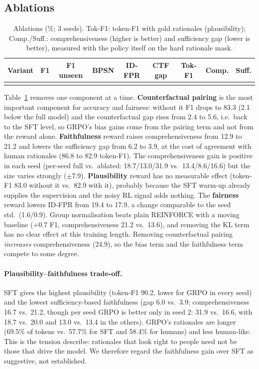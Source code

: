 \documentclass[11pt]{article}
\begin{document}
\subsection{Ablations}
\begin{table}[t]
\centering\small\setlength{\tabcolsep}{3.4pt}
\begin{tabular}{lcccccccc}
\toprule
Variant & F1 & F1 unseen & BPSN & ID-FPR & CTF gap & Tok-F1 & Comp. & Suff.\\
\midrule
\\
\bottomrule
\end{tabular}
\caption{Ablations (\%; 3 seeds). Tok-F1: token-F1 with gold rationales (plausibility); Comp./Suff.: comprehensiveness (higher is better) and
sufficiency gap (lower is better), measured with the policy itself on the hard rationale mask.}
\label{tab:abl}
\end{table}
Table~\ref{tab:abl} removes one component at a time. \textbf{Counterfactual pairing} is the most important component for accuracy and fairness: without it F1 drops to 83.3 (2.1 below
the full model) and the counterfactual gap rises from 2.4 to 5.6, i.e.\ back to the SFT level, so GRPO's bias gains come
from the pairing term and not from the reward alone. \textbf{Faithfulness} reward raises comprehensiveness from 12.9 to 21.2 and lowers the sufficiency gap
from 6.2 to 3.9, at the cost of agreement with human rationales (86.8 to 82.9 token-F1). The comprehensiveness gain is positive in each seed (per-seed full vs.\ ablated: 18.7/13.0/31.9 vs.\ 13.4/8.6/16.6)
but the size varies strongly ($\pm$7.9). \textbf{Plausibility} reward has no measurable effect (token-F1 83.0 without it vs.\ 82.9 with it), probably because the SFT warm-up already supplies the
supervision and the noisy RL signal adds nothing. The \textbf{fairness} reward lowers ID-FPR from 19.4 to 17.9, a change comparable to the seed std.\ (1.6/0.9). Group normalisation
beats plain REINFORCE with a moving baseline (+0.7 F1, comprehensiveness 21.2 vs.\ 13.6), and removing the KL term has no clear effect at this training length. Removing counterfactual pairing
\emph{increases} comprehensiveness (24.9), so the bias term and the faithfulness term compete to some degree.

\paragraph{Plausibility--faithfulness trade-off.} SFT gives the highest plausibility (token-F1 90.2, lower for GRPO in every seed) and the lowest sufficiency-based faithfulness (gap 6.0 vs.\ 3.9; comprehensiveness 16.7 vs.\ 21.2, though per seed GRPO is
better only in seed 2: 31.9 vs.\ 16.6, with 18.7 vs.\ 20.0 and 13.0 vs.\ 13.4 in the others). GRPO's rationales are
longer (69.5\% of tokens vs.\ 57.7\% for SFT and 58.4\% for humans) and less human-like. This is the tension \citet{jacovi2020faithfulness} describe: rationales that look
right to people need not be those that drive the model. We therefore regard the faithfulness gain over SFT as suggestive, not established.
\end{document}
